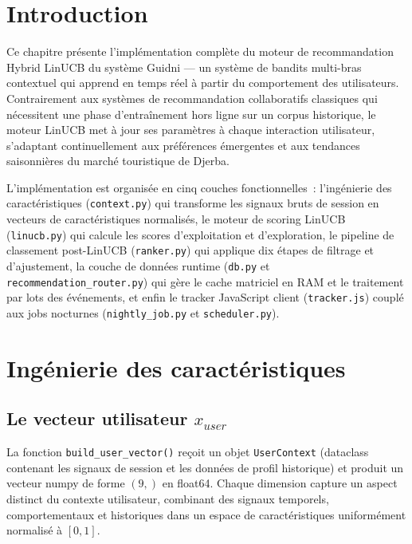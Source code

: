
\section{Introduction}

Ce chapitre présente l'implémentation complète du moteur de recommandation Hybrid LinUCB du
système Guidni --- un système de bandits multi-bras contextuel qui apprend en temps réel à
partir du comportement des utilisateurs. Contrairement aux systèmes de recommandation
collaboratifs classiques qui nécessitent une phase d'entraînement hors ligne sur un corpus
historique, le moteur LinUCB met à jour ses paramètres à chaque interaction utilisateur,
s'adaptant continuellement aux préférences émergentes et aux tendances saisonnières du marché
touristique de Djerba.

L'implémentation est organisée en cinq couches fonctionnelles~: l'ingénierie des
caractéristiques (\texttt{context.py}) qui transforme les signaux bruts de session en vecteurs
de caractéristiques normalisés, le moteur de scoring LinUCB (\texttt{linucb.py}) qui calcule
les scores d'exploitation et d'exploration, le pipeline de classement post-LinUCB
(\texttt{ranker.py}) qui applique dix étapes de filtrage et d'ajustement, la couche de données
runtime (\texttt{db.py} et \texttt{recommendation\_router.py}) qui gère le cache matriciel en
RAM et le traitement par lots des événements, et enfin le tracker JavaScript client
(\texttt{tracker.js}) couplé aux jobs nocturnes (\texttt{nightly\_job.py} et
\texttt{scheduler.py}).


\section{Ingénierie des caractéristiques}

\subsection{Le vecteur utilisateur $x_{user}$}

La fonction \texttt{build\_user\_vector()} reçoit un objet \texttt{UserContext} (dataclass
contenant les signaux de session et les données de profil historique) et produit un vecteur
numpy de forme $(9,)$ en float64. Chaque dimension capture un aspect distinct du contexte
utilisateur, combinant des signaux temporels, comportementaux et historiques dans un espace
de caractéristiques uniformément normalisé à $[0, 1]$.

